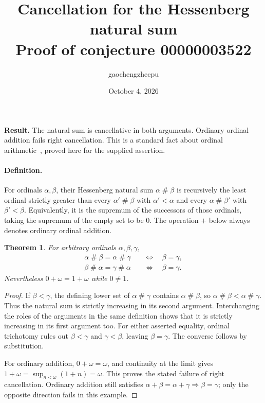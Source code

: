 \documentclass[11pt]{article}
\title{Cancellation for the Hessenberg natural sum\\\large Proof of conjecture 00000003522}
\author{gaochengzhecpu}
\date{October 4, 2026}
\newtheorem{theorem}{Theorem}
\newcommand{\ns}{\mathbin{\#}}
\begin{document}
\maketitle
\noindent\textbf{Result.} The natural sum is cancellative in both arguments.
Ordinary ordinal addition fails right cancellation. This is a standard fact
about ordinal arithmetic~\cite{Lipparini}, proved here for the supplied assertion.

\paragraph{Definition.}
For ordinals $\alpha,\beta$, their Hessenberg natural sum $\alpha\ns\beta$
is recursively the least ordinal strictly greater than every
$\alpha'\ns\beta$ with $\alpha'<\alpha$ and every
$\alpha\ns\beta'$ with $\beta'<\beta$. Equivalently, it is the supremum
of the successors of those ordinals, taking the supremum of the empty set
to be $0$. The operation $+$ below always denotes ordinary ordinal addition.

\begin{theorem}
For arbitrary ordinals $\alpha,\beta,\gamma$,
\begin{align*}
 \alpha\ns\beta=\alpha\ns\gamma&\quad\Longleftrightarrow\quad\beta=\gamma,\\
 \beta\ns\alpha=\gamma\ns\alpha&\quad\Longleftrightarrow\quad\beta=\gamma.
\end{align*}
Nevertheless $0+\omega=1+\omega$ while $0\ne1$.
\end{theorem}
\begin{proof}
If $\beta<\gamma$, the defining lower set of $\alpha\ns\gamma$ contains
$\alpha\ns\beta$, so $\alpha\ns\beta<\alpha\ns\gamma$.
Thus the natural sum is strictly increasing in its second argument.
Interchanging the roles of the arguments in the same definition shows
that it is strictly increasing in its first argument too.
For either asserted equality, ordinal trichotomy rules out $\beta<\gamma$
and $\gamma<\beta$, leaving $\beta=\gamma$. The converse follows by substitution.

For ordinary addition, $0+\omega=\omega$, and continuity at the limit gives
$1+\omega=\sup_{n<\omega}(1+n)=\omega$. This proves the stated failure
of right cancellation. Ordinary addition still satisfies
$\alpha+\beta=\alpha+\gamma\Rightarrow\beta=\gamma$; only the opposite
direction fails in this example.
\end{proof}
\end{document}
